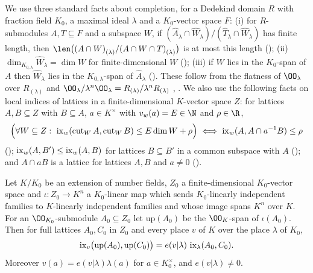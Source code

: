 We use three standard facts about completion, for a Dedekind domain $R$ with fraction field $K_0$, a maximal ideal $\lambda$ and a
$K_0$-vector space $F$: (i) for $R$-submodules $A,T\subseteq F$ and a subspace $W$, if $(\widehat A_\lambda\cap\widehat
W_\lambda)/(\widehat T_\lambda\cap\widehat W_\lambda)$ has finite length, then $\len\bigl(\ontoIIloc{\lambda}{(A\cap
W)}/\ontoIIloc{\lambda}{(A\cap W\cap T)}\bigr)$ is at most this length ();
(ii) $\dim_{K_{0,\lambda}}\widehat W_\lambda=\dim W$ for finite-dimensional $W$
(); (iii) if $W$ lies in the $K_0$-span of $A$ then $\widehat W_\lambda$ lies
in the $K_{0,\lambda}$-span of $\widehat A_\lambda$ (). These follow from the
flatness of $\OO_\lambda$ over $R_{(\lambda)}$ and $\OO_\lambda/\lambda^n\OO_\lambda=R_{(\lambda)}/\lambda^nR_{(\lambda)}$
\cite[Ch.~II]{Serre1979}, \cite[Thms.~7.2, 8.8]{Matsumura1989}. We also use the following facts on local indices of lattices in a
finite-dimensional $K$-vector space $Z$: for lattices $A,B\subseteq Z$ with $B\subseteq A$, $a\in K^\times$ with $v_w(a)=E\in\N$ and
$\rho\in\R$,
\begin{equation}\label{eq:pf:onto2:threeforms}
\Bigl(\forall W\subseteq Z:\ \operatorname{ix}_w(\operatorname{cut}_WA,\operatorname{cut}_WB)\le E\dim W+\rho\Bigr)\iff
\operatorname{ix}_w(A,A\cap a^{-1}B)\le\rho
\end{equation}
(); $\operatorname{ix}_w(A,B')\le\operatorname{ix}_w(A,B)$ for lattices $B\subseteq B'$ in a
common subspace with $A$ (); and $A\cap aB$ is a lattice for lattices $A,B$
and $a\ne0$ ().

\begin{lemma}\label{pf:onto2:l3}
Let $K/K_0$ be an extension of number fields, $Z_0$ a finite-dimensional $K_0$-vector space and $\iota:Z_0\to K^n$ a $K_0$-linear
map which sends $K_0$-linearly independent families to $K$-linearly independent families and whose image spans $K^n$ over $K$. For
an $\OO_{K_0}$-submodule $A_0\subseteq Z_0$ let $\mathrm{up}(A_0)$ be the $\OO_K$-span of $\iota(A_0)$. Then for full lattices
$A_0,C_0$ in $Z_0$ and every place $v$ of $K$ over the place $\lambda$ of $K_0$,
\[
\operatorname{ix}_v\bigl(\mathrm{up}(A_0),\mathrm{up}(C_0)\bigr)=e(v|\lambda)\,\operatorname{ix}_\lambda(A_0,C_0).
\]
Moreover $v(a)=e(v|\lambda)\lambda(a)$ for $a\in K_0^\times$, and $e(v|\lambda)\ne0$.
\end{lemma}


